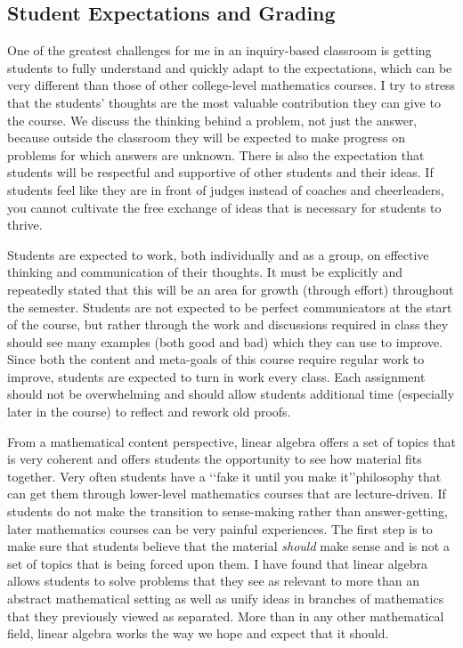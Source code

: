 \begin{annotation}
\subsection{Student Expectations and Grading}
One of the greatest challenges for me in an inquiry-based classroom is getting students to fully understand and quickly adapt to the expectations, which can be very different than those of other college-level mathematics courses. I try to stress that the students' thoughts are the most valuable contribution they can give to the course. We discuss the thinking behind a problem, not just the answer, because outside the classroom they will be expected to make progress on problems for which answers are unknown. There is also the expectation that students will be respectful and supportive of other students and their ideas. If students feel like they are in front of judges instead of coaches and cheerleaders, you cannot cultivate the free exchange of ideas that is necessary for students to thrive.

Students are expected to work, both individually and as a group, on effective thinking and communication of their thoughts. It must be explicitly and repeatedly stated that this will be an area for growth (through effort) throughout the semester. Students are not expected to be perfect communicators at the start of the course, but rather through the work and discussions required in class they should see many examples (both good and bad) which they can use to improve. Since both the content and meta-goals of this course require regular work to improve, students are expected to turn in work every class. Each assignment should not be overwhelming and should allow students additional time (especially later in the course) to reflect and rework old proofs.

From a mathematical content perspective, linear algebra offers a set of topics that is very coherent and offers students the opportunity to see how material fits together. Very often students have a \lq\lq{fake it until you make it}\rq\rq philosophy that can get them through lower-level mathematics courses that are lecture-driven. If students do not make the transition to sense-making rather than answer-getting, later mathematics courses can be very painful experiences. The first step is to make sure that students believe that the material \emph{should} make sense and is not a set of topics that is being forced upon them. I have found that linear algebra allows students to solve problems that they see as relevant to more than an abstract mathematical setting as well as unify ideas in branches of mathematics that they previously viewed as separated. More than in any other mathematical field, linear algebra works the way we hope and expect that it should.


\end{annotation}
